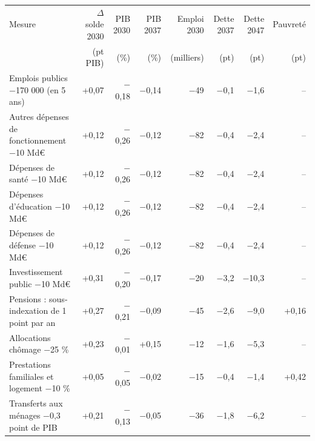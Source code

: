 \begin{tabular}{p{5.2cm}rrrrrrr}
\toprule
Mesure & $\Delta$solde 2030 & PIB 2030 & PIB 2037 & Emploi 2030 & Dette 2037 & Dette 2047 & Pauvreté \\
 & (pt PIB) & (\%) & (\%) & (milliers) & (pt) & (pt) & (pt) \\
\midrule
Emplois publics −170 000 (en 5 ans) & +0{,}07 & $-$0{,}18 & $-$0{,}14 & $-$49 & $-$0{,}1 & $-$1{,}6 & -- \\
Autres dépenses de fonctionnement −10 Md€ & +0{,}12 & $-$0{,}26 & $-$0{,}12 & $-$82 & $-$0{,}4 & $-$2{,}4 & -- \\
Dépenses de santé −10 Md€ & +0{,}12 & $-$0{,}26 & $-$0{,}12 & $-$82 & $-$0{,}4 & $-$2{,}4 & -- \\
Dépenses d'éducation −10 Md€ & +0{,}12 & $-$0{,}26 & $-$0{,}12 & $-$82 & $-$0{,}4 & $-$2{,}4 & -- \\
Dépenses de défense −10 Md€ & +0{,}12 & $-$0{,}26 & $-$0{,}12 & $-$82 & $-$0{,}4 & $-$2{,}4 & -- \\
Investissement public −10 Md€ & +0{,}31 & $-$0{,}20 & $-$0{,}17 & $-$20 & $-$3{,}2 & $-$10{,}3 & -- \\
Pensions : sous-indexation de 1 point par an & +0{,}27 & $-$0{,}21 & $-$0{,}09 & $-$45 & $-$2{,}6 & $-$9{,}0 & +0{,}16 \\
Allocations chômage −25 \% & +0{,}23 & $-$0{,}01 & +0{,}15 & $-$12 & $-$1{,}6 & $-$5{,}3 & -- \\
Prestations familiales et logement −10 \% & +0{,}05 & $-$0{,}05 & $-$0{,}02 & $-$15 & $-$0{,}4 & $-$1{,}4 & +0{,}42 \\
Transferts aux ménages −0,3 point de PIB & +0{,}21 & $-$0{,}13 & $-$0{,}05 & $-$36 & $-$1{,}8 & $-$6{,}2 & -- \\
\bottomrule
\end{tabular}
